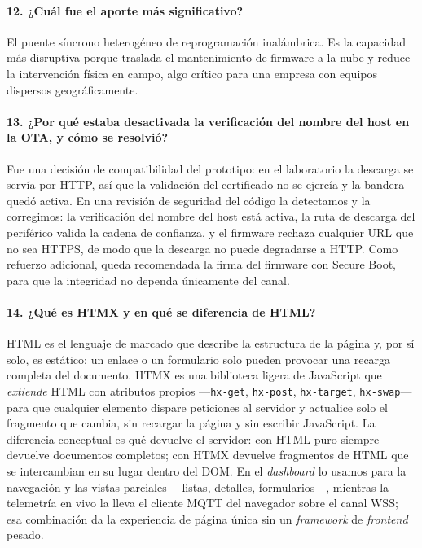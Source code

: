 \documentclass[11pt, a4paper]{article}
\begin{document}
\paragraph{12. ¿Cuál fue el aporte más significativo?}
El puente síncrono heterogéneo de reprogramación inalámbrica. Es la capacidad más disruptiva porque traslada el mantenimiento de firmware a la nube y reduce la intervención física en campo, algo crítico para una empresa con equipos dispersos geográficamente.

\paragraph{13. ¿Por qué estaba desactivada la verificación del nombre del host en la OTA, y cómo se resolvió?}
Fue una decisión de compatibilidad del prototipo: en el laboratorio la descarga se servía por HTTP, así que la validación del certificado no se ejercía y la bandera quedó activa. En una revisión de seguridad del código la detectamos y la corregimos: la verificación del nombre del host está activa, la ruta de descarga del periférico valida la cadena de confianza, y el firmware rechaza cualquier URL que no sea HTTPS, de modo que la descarga no puede degradarse a HTTP. Como refuerzo adicional, queda recomendada la firma del firmware con Secure Boot, para que la integridad no dependa únicamente del canal.

\paragraph{14. ¿Qué es HTMX y en qué se diferencia de HTML?}
HTML es el lenguaje de marcado que describe la estructura de la página y, por sí solo, es estático: un enlace o un formulario solo pueden provocar una recarga completa del documento. HTMX es una biblioteca ligera de JavaScript que \textit{extiende} HTML con atributos propios ---\texttt{hx-get}, \texttt{hx-post}, \texttt{hx-target}, \texttt{hx-swap}--- para que cualquier elemento dispare peticiones al servidor y actualice solo el fragmento que cambia, sin recargar la página y sin escribir JavaScript. La diferencia conceptual es qué devuelve el servidor: con HTML puro siempre devuelve documentos completos; con HTMX devuelve fragmentos de HTML que se intercambian en su lugar dentro del DOM. En el \textit{dashboard} lo usamos para la navegación y las vistas parciales ---listas, detalles, formularios---, mientras la telemetría en vivo la lleva el cliente MQTT del navegador sobre el canal WSS; esa combinación da la experiencia de página única sin un \textit{framework} de \textit{frontend} pesado.
\end{document}
